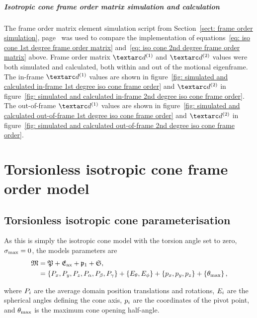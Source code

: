\subparagraph[Frame order matrix simulation and calculation]{Isotropic cone frame order matrix simulation and calculation}

The frame order matrix element simulation script from Section~\ref{sect: frame order simulation}, page~\pageref{sect: frame order simulation} was used to compare the implementation of equations~\ref{eq: iso cone 1st degree frame order matrix} and~\ref{eq: iso cone 2nd degree frame order matrix} above.
Frame order matrix $\FOone$ and $\FOtwo$ values were both simulated and calculated, both within and out of the motional eigenframe.
The in-frame $\FOone$ values are shown in figure~\ref{fig: simulated and calculated in-frame 1st degree iso cone frame order} and $\FOtwo$ in figure~\ref{fig: simulated and calculated in-frame 2nd degree iso cone frame order}.
The out-of-frame $\FOone$ values are shown in figure~\ref{fig: simulated and calculated out-of-frame 1st degree iso cone frame order} and $\FOtwo$ in figure~\ref{fig: simulated and calculated out-of-frame 2nd degree iso cone frame order}.



\section{Torsionless isotropic cone frame order model}


\subsection{Torsionless isotropic cone parameterisation}

As this is simply the isotropic cone model with the torsion angle set to zero, $\sigma_\textrm{max} = 0$, the models parameters are
\begin{subequations}
\begin{align}
    \mathfrak{M} &= \mathfrak{P} + \mathfrak{E}_\textrm{ax} + \mathfrak{p}_1 + \mathfrak{S}, \\
              &= \left\{ P_x, P_y, P_z, P_\alpha, P_\beta, P_\gamma \right\} + \left\{ E_\theta, E_\phi \right\} + \left\{ p_x, p_y, p_z \right\} + \left\{ \theta_\textrm{max} \right\} ,
\end{align}
\end{subequations}

where $P_i$ are the average domain position translations and rotations, $E_i$ are the spherical angles defining the cone axis, $p_i$ are the coordinates of the pivot point, and $\theta_\textrm{max}$ is the maximum cone opening half-angle.


